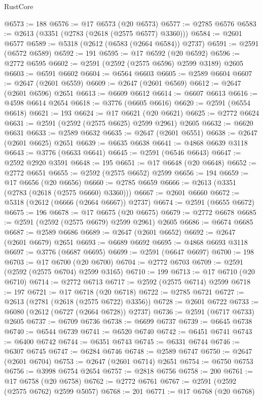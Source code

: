 \begin{lexlean}{RustCore}
\begin{coremodule}
@6573 := 188
@6576 := @17 @6573 (@20 @6573)
@6577 := @2785 @6576
@6583 := @2613 (@3351 (@2783 (@2618 (@2575 @6577) @3360)))
@6584 := @2601 @6577
@6589 := @5318 (@2612 (@6583 (@2664 @6584)) @2737)
@6591 := @2591 (@6572 @6589)
@6592 := 191
@6595 := @17 @6592 (@20 @6592)
@6596 := @2772 @6595
@6602 := @2591 (@2592 (@2575 @6596) @2599 @3189) @2605
@6603 := @6591 @6602
@6604 := @6564 @6603
@6605 := @2589 @6604
@6607 := @2647 (@2601 @6559)
@6609 := @2647 (@2601 @6569)
@6612 := @2647 (@2601 @6596) @2651
@6613 := @6609 @6612
@6614 := @6607 @6613
@6616 := @4598 @6614 @2654
@6618 := @3776 (@6605 @6616)
@6620 := @2591 (@6554 @6618)
@6621 := 193
@6624 := @17 @6621 (@20 @6621)
@6625 := @2772 @6624
@6631 := @2591 (@2592 (@2575 @6625) @2599 @2961) @2605
@6632 := @6620 @6631
@6633 := @2589 @6632
@6635 := @2647 (@2601 @6551)
@6638 := @2647 (@2601 @6625) @2651
@6639 := @6635 @6638
@6641 := @4868 @6639 @3118
@6643 := @3776 (@6633 @6641)
@6645 := @2591 (@6546 @6643)
@6647 := @2592 @2920 @3591
@6648 := 195
@6651 := @17 @6648 (@20 @6648)
@6652 := @2772 @6651
@6655 := @2592 (@2575 @6652) @2599
@6656 := 194
@6659 := @17 @6656 (@20 @6656)
@6660 := @2785 @6659
@6666 := @2613 (@3351 (@2783 (@2618 (@2575 @6660) @3360)))
@6667 := @2601 @6660
@6672 := @5318 (@2612 (@6666 (@2664 @6667)) @2737)
@6674 := @2591 (@6655 @6672)
@6675 := 196
@6678 := @17 @6675 (@20 @6675)
@6679 := @2772 @6678
@6685 := @2591 (@2592 (@2575 @6679) @2599 @2961) @2605
@6686 := @6674 @6685
@6687 := @2589 @6686
@6689 := @2647 (@2601 @6652)
@6692 := @2647 (@2601 @6679) @2651
@6693 := @6689 @6692
@6695 := @4868 @6693 @3118
@6697 := @3776 (@6687 @6695)
@6699 := @2591 (@6647 @6697)
@6700 := 198
@6703 := @17 @6700 (@20 @6700)
@6704 := @2772 @6703
@6709 := @2591 (@2592 (@2575 @6704) @2599 @3165)
@6710 := 199
@6713 := @17 @6710 (@20 @6710)
@6714 := @2772 @6713
@6717 := @2592 (@2575 @6714) @2599
@6718 := 197
@6721 := @17 @6718 (@20 @6718)
@6722 := @2785 @6721
@6727 := @2613 (@2781 (@2618 (@2575 @6722) @3356))
@6728 := @2601 @6722
@6733 := @6080 (@2612 (@6727 (@2664 @6728)) @2737)
@6736 := @2591 (@6717 @6733) @2605
@6737 := @6709 @6736
@6738 := @6699 @6737
@6739 := @6645 @6738
@6740 := @6544 @6739
@6741 := @6520 @6740
@6742 := @6451 @6741
@6743 := @6400 @6742
@6744 := @6351 @6743
@6745 := @6331 @6744
@6746 := @6307 @6745
@6747 := @6284 @6746
@6748 := @2589 @6747
@6750 := @2647 (@2601 @6704)
@6753 := @2647 (@2601 @6714) @2651
@6754 := @6750 @6753
@6756 := @3998 @6754 @2654
@6757 := @2818 @6756
@6758 := 200
@6761 := @17 @6758 (@20 @6758)
@6762 := @2772 @6761
@6767 := @2591 (@2592 (@2575 @6762) @2599 @5057)
@6768 := 201
@6771 := @17 @6768 (@20 @6768)

\end{coremodule}
\end{lexlean}
